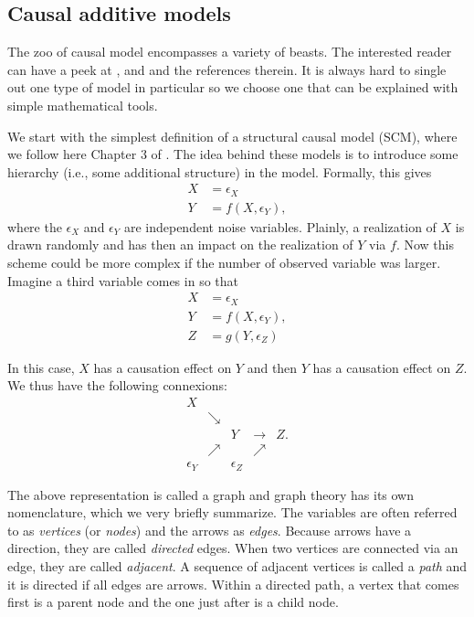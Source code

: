 \documentclass[]{krantz}
\theoremstyle{definition}
\theoremstyle{definition}
\theoremstyle{definition}
\theoremstyle{remark}
\begin{document}
\hypertarget{causal-additive-models}{%
\subsection{Causal additive models}\label{causal-additive-models}}

The zoo of causal model encompasses a variety of beasts. The interested
reader can have a peek at \citet{pearl2009causality},
\citet{peters2017elements} and \citet{maathuis2018handbook} and the
references therein. It is always hard to single out one type of model in
particular so we choose one that can be explained with simple
mathematical tools.

We start with the simplest definition of a structural causal model
(SCM), where we follow here Chapter 3 of \citet{peters2017elements}. The
idea behind these models is to introduce some hierarchy (i.e., some
additional structure) in the model. Formally, this gives \begin{align*}
X&=\epsilon_X \\ 
Y&=f(X,\epsilon_Y),
\end{align*} where the \(\epsilon_X\) and \(\epsilon_Y\) are independent
noise variables. Plainly, a realization of \(X\) is drawn randomly and
has then an impact on the realization of \(Y\) via \(f\). Now this
scheme could be more complex if the number of observed variable was
larger. Imagine a third variable comes in so that \begin{align*}
X&=\epsilon_X \\ 
Y&=f(X,\epsilon_Y),\\
Z&=g(Y,\epsilon_Z)
\end{align*}

In this case, \(X\) has a causation effect on \(Y\) and then \(Y\) has a
causation effect on \(Z\). We thus have the following connexions:
\[\begin{array}{ccccccc} X & &&&\\
&\searrow & &&\\
&&Y&\rightarrow&Z. \\
&\nearrow &&\nearrow& \\
\epsilon_Y & &\epsilon_Z 
\end{array}\]

The above representation is called a graph and graph theory has its own
nomenclature, which we very briefly summarize. The variables are often
referred to as \emph{vertices} (or \emph{nodes}) and the arrows as
\emph{edges}. Because arrows have a direction, they are called
\emph{directed} edges. When two vertices are connected via an edge, they
are called \emph{adjacent}. A sequence of adjacent vertices is called a
\emph{path} and it is directed if all edges are arrows. Within a
directed path, a vertex that comes first is a parent node and the one
just after is a child node.
\end{document}
